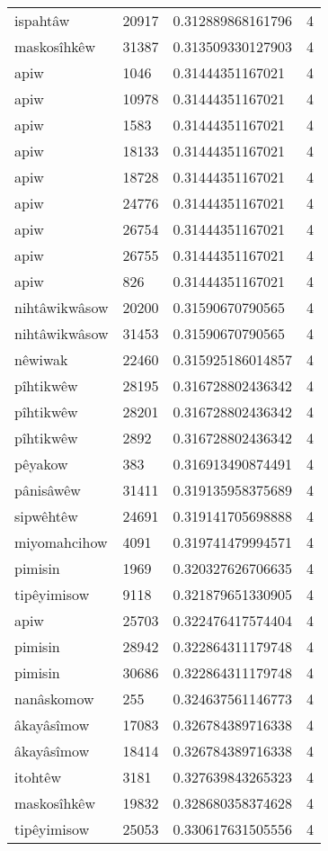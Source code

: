 \begin{longtable}{llll}
ispahtâw & 20917 & 0.312889868161796 & 4 \\
maskosîhkêw & 31387 & 0.313509330127903 & 4 \\
apiw & 1046 & 0.31444351167021 & 4 \\
apiw & 10978 & 0.31444351167021 & 4 \\
apiw & 1583 & 0.31444351167021 & 4 \\
apiw & 18133 & 0.31444351167021 & 4 \\
apiw & 18728 & 0.31444351167021 & 4 \\
apiw & 24776 & 0.31444351167021 & 4 \\
apiw & 26754 & 0.31444351167021 & 4 \\
apiw & 26755 & 0.31444351167021 & 4 \\
apiw & 826 & 0.31444351167021 & 4 \\
nihtâwikwâsow & 20200 & 0.31590670790565 & 4 \\
nihtâwikwâsow & 31453 & 0.31590670790565 & 4 \\
nêwiwak & 22460 & 0.315925186014857 & 4 \\
pîhtikwêw & 28195 & 0.316728802436342 & 4 \\
pîhtikwêw & 28201 & 0.316728802436342 & 4 \\
pîhtikwêw & 2892 & 0.316728802436342 & 4 \\
pêyakow & 383 & 0.316913490874491 & 4 \\
pânisâwêw & 31411 & 0.319135958375689 & 4 \\
sipwêhtêw & 24691 & 0.319141705698888 & 4 \\
miyomahcihow & 4091 & 0.319741479994571 & 4 \\
pimisin & 1969 & 0.320327626706635 & 4 \\
tipêyimisow & 9118 & 0.321879651330905 & 4 \\
apiw & 25703 & 0.322476417574404 & 4 \\
pimisin & 28942 & 0.322864311179748 & 4 \\
pimisin & 30686 & 0.322864311179748 & 4 \\
nanâskomow & 255 & 0.324637561146773 & 4 \\
âkayâsîmow & 17083 & 0.326784389716338 & 4 \\
âkayâsîmow & 18414 & 0.326784389716338 & 4 \\
itohtêw & 3181 & 0.327639843265323 & 4 \\
maskosîhkêw & 19832 & 0.328680358374628 & 4 \\
tipêyimisow & 25053 & 0.330617631505556 & 4 \\

\end{longtable}
